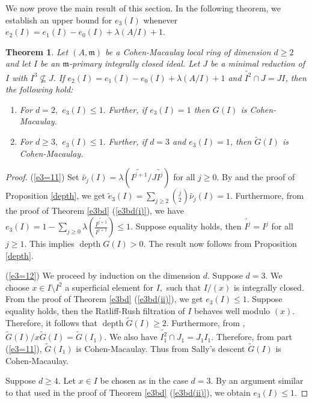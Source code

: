 \documentclass[11pt]{amsart}
\theoremstyle{plain}
\newtheorem{theorem}{Theorem}[section]
\newcommand{\m}{\mathfrak{m}}
\newcommand{\wt}{\widetilde}
\newcommand{\depth}{\operatorname{depth}}
\theoremstyle{plain}
\begin{document}
We now prove the main result of this section. In the following theorem, we establish an upper bound for $e_{3}(I)$ whenever $e_2(I)=e_1(I)-e_0(I)+\lambda(A/I)+1$. 





\begin{theorem}\label{e3=1}
Let $(A,\m) $ be a Cohen-Macaulay local ring of dimension $d \geq 2$ and let $I$ be an $\m$-primary integrally closed ideal. Let $J$ be a minimal reduction of $I$ with $I^3\nsubseteq J.$ If $e_2(I)=e_1(I)-e_0(I)+\lambda(A/I)+1$ and $\wt{I^2}\cap J=JI$, then the following hold:
\begin{enumerate} [\normalfont(i)]
    \item  \label{e3=11}For $d=2,$ $e_3(I)\leq 1.$ Further, if  $e_3(I)=1$ then $G(I)$ is Cohen-Macaulay.

    \item\label{e3=12} For $d\geq 3,$ $e_3(I)\leq 1.$ Further, if $d=3$ and $e_3(I)=1$, then $\wt{G}(I)$ is Cohen-Macaulay.  %
\end{enumerate}
\end{theorem}
\begin{proof} 
(\ref{e3=11}) Set $\wt{\nu_j}(I)=\lambda(\wt{I^{j+1}}/J\wt{I^j})$ for all $j\geq 0.$ By \cite[Theorem 2.5$(c)$]{rossi2010hilbert} and the proof of Proposition \ref{depth}, we get $ \wt{e}_{3}(I)= \displaystyle \sum _{j \geq 2}\binom{j}{2}\wt{\nu_j}(I)=1.$ Furthermore, from the proof of Theorem \ref{e3bd} (\ref{e3bd(i)}), we have $ e_{3}(I)=1- \displaystyle\sum_{j\geq 0}\lambda\left(\frac{\widetilde{I^{j+1}}}{I^{j+1}}\right)\leq 1.$
    Suppose equality holds, then $\widetilde{I^{j}}=I^{j}$ for all $j \geq 1.$ This implies $\depth G(I) >0.$ The result now follows from Proposition \ref{depth}.

\noindent
(\ref{e3=12})   We proceed by induction on the dimension $d$. Suppose $d=3.$ We choose $x \in I\setminus I^2$ a superficial element for $I,$ such that $I/(x)$ is integrally closed. From the proof of Theorem \ref{e3bd} (\ref{e3bd(ii)}), we get $e_3(I)\leq 1$. Suppose equality holds, then the Ratliff-Rush filtration of $I$ behaves well modulo $(x).$ Therefore, it follows that  $\depth \widetilde{G}(I) \geq 2.$ Furthermore, from \cite[Remark 4.5]{Part2}, $\widetilde{G}(I)/x\widetilde{G}(I)=\widetilde{G}({I_1}).$ We also have $\wt{I^2_1}\cap J_1=J_1I_1$. Therefore, from part (\ref{e3=11}), $\wt{G}(I_1)$ is Cohen-Macaulay. Thus from Sally's descent $\widetilde{G}(I)$ is Cohen-Macaulay.

Suppose $d\geq 4.$ Let $x \in I$ be chosen as in the case $d=3.$ By an argument similar to that used in the proof of Theorem \ref{e3bd} (\ref{e3bd(ii)}), we obtain  $e_3(I)\leq 1.$ 
\end{proof}
\end{document}
